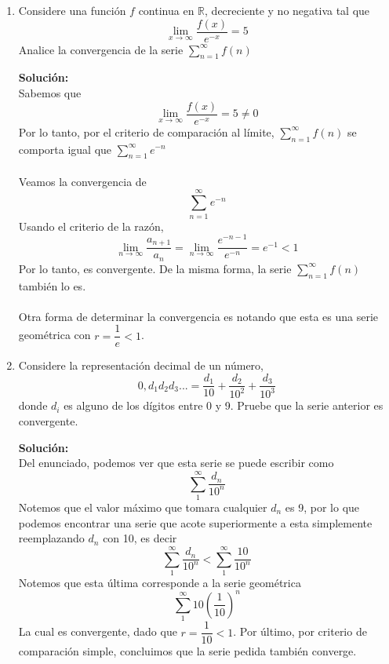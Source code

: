 \documentclass[12pt]{article}
\newenvironment{solucion}
{\begin{mdframed}[backgroundcolor=black!10]
		{\bf Solución:}\\
	}
	{
	\end{mdframed}
}
\newenvironment{preguntas}
{\begin{enumerate}\itemsep12pt
	}
	{
	\end{enumerate}
}
\newcommand{\ra}{\rightarrow}
\newcommand{\R}{\mathbb{R}}
\begin{document}
\begin{preguntas}
\begin{solucion}
Luego,
$$\lim\limits_{x \ra \infty} \dfrac{1}{a_n}
= \dfrac{1}{\lim\limits_{x \ra \infty} a_n}
= \dfrac{1}{0}
= \infty
\neq 0$$
Entonces, por la prueba de la divergencia, $\sum\limits_{n=1}^{\infty}\dfrac{1}{a_n}$ diverge.
\end{solucion}
\item Considere una función $f$ continua en $\R$, decreciente y no negativa tal que
	$$\lim_{x\ra\infty}\dfrac{f(x)}{e^{-x}}=5$$
	Analice la convergencia de la serie $\sum\limits_{n=1}^{\infty}f(n)$
\begin{solucion}
Sabemos que
		$$\lim_{x\ra\infty}\dfrac{f(x)}{e^{-x}}=5 \neq 0$$
		Por lo tanto, por el criterio de comparación al límite, $\sum\limits_{n=1}^{\infty}f(n)$ se comporta igual que $\sum\limits_{n=1}^{\infty}e^{-n}$\\
		\\
		Veamos la convergencia de 
		$$\sum\limits_{n=1}^{\infty}e^{-n}$$
		Usando el criterio de la razón,
		$$\lim\limits_{n \ra \infty} \dfrac{a_{n+1}}{a_n}
		= \lim\limits_{n \ra \infty} \dfrac{e^{-n-1}}{e^{-n}}
		= e^{-1} < 1$$
		Por lo tanto, es convergente. De la misma forma, la serie $\sum\limits_{n=1}^{\infty}f(n)$ también lo es.
\\
\\
Otra forma de determinar la convergencia es notando que esta es una serie geométrica con $r = \dfrac{1}{e} < 1$.
\end{solucion}
\item Considere la representación decimal de un número,
$$0,d_1d_2d_3... = \dfrac{d_1}{10} + \dfrac{d_2}{10^2} + \dfrac{d_3}{10^3}$$
donde $d_i$ es alguno de los dígitos entre 0 y 9. Pruebe que la serie anterior es convergente.
\begin{solucion}
Del enunciado, podemos ver que esta serie se puede escribir como
$$\sum\limits_{1}^{\infty} \dfrac{d_n}{10^n}$$
Notemos que el valor máximo que tomara cualquier $d_n$ es 9, por lo que podemos encontrar una serie que acote superiormente a esta simplemente reemplazando $d_n$ con 10, es decir
$$\sum\limits_{1}^{\infty} \dfrac{d_n}{10^n} < \sum\limits_{1}^{\infty} \dfrac{10}{10^n}$$
Notemos que esta última corresponde a la serie geométrica
$$\sum\limits_{1}^{\infty} 10\left(\dfrac{1}{10}\right)^n$$
La cual es convergente, dado que $r = \dfrac{1}{10} < 1$.
Por último, por criterio de comparación simple, concluimos que la serie pedida también converge.
\end{solucion}
\end{preguntas}
\end{document}
